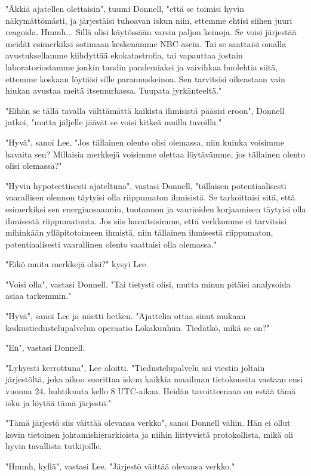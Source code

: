 "Äkkiä ajatellen olettaisin", tuumi Donnell, "että se toimisi hyvin näkymättömästi, ja järjestäisi tuhoavan iskun niin, ettemme ehtisi siihen juuri reagoida. Hmmh... Sillä olisi käytössään varsin paljon keinoja. Se voisi järjestää meidät esimerkiksi sotimaan keskenämme NBC-asein. Tai se saattaisi omalla avustuksellamme kiihdyttää ekokatastrofia, tai vapauttaa jostain laboratoriostamme jonkin taudin pandemiaksi ja vaivihkaa huolehtia siitä, ettemme koskaan löytäisi sille parannuskeinoa. Sen tarvitsisi oikeastaan vain hiukan avustaa meitä itsemurhassa. Tuupata jyrkänteeltä."


"Eihän se tällä tavalla välttämättä kaikista ihmisistä pääsisi eroon", Donnell jatkoi, "mutta jäljelle jäävät se voisi kitkeä muilla tavoilla."


"Hyvä", sanoi Lee, "Jos tällainen olento olisi olemassa, niin kuinka voisimme havaita sen? Millaisia merkkejä voisimme olettaa löytävämme, jos tällainen olento olisi olemassa?"


"Hyvin hypoteettisesti ajateltuna", vastasi Donnell, "tällaisen potentiaalisesti vaarallisen olennon täytyisi olla riippumaton ihmisistä. Se tarkoittaisi sitä, että esimerkiksi sen energiansaannin, tuotannon ja vaurioiden korjaamisen täytyisi olla ihmisestä riippumatonta. Jos siis havaitsisimme, että verkkomme ei tarvitsisi mihinkään ylläpitotoimeen ihmistä, niin tällainen ihmisestä riippumaton, potentiaalisesti vaarallinen olento saattaisi olla olemassa."


"Eikö muita merkkejä olisi?" kysyi Lee.


"Voisi olla", vastasi Donnell. "Tai tietysti olisi, mutta minun pitäisi analysoida asiaa tarkemmin."


"Hyvä", sanoi Lee ja mietti hetken. "Ajattelin ottaa sinut mukaan keskustiedustelupalvelun operaatio Lokakuuhun. Tiedätkö, mikä se on?"


"En", vastasi Donnell.


"Lyhyesti kerrottuna", Lee aloitti. "Tiedustelupalvelu sai viestin joltain järjestöltä, joka aikoo suorittaa iskun kaikkia maailman tietokoneita vastaan ensi vuonna 24. huhtikuuta kello 8 UTC-aikaa. Heidän tavoitteenaan on estää tämä isku ja löytää tämä järjestö."


"Tämä järjestö siis väittää olevansa verkko", sanoi Donnell väliin. Hän ei ollut kovin tietoinen johtamishierarkioista ja niihin liittyvistä protokollista, mikä oli hyvin tavallista tutkijoille.


"Hmmh, kyllä", vastasi Lee. "Järjestö väittää olevansa verkko."


